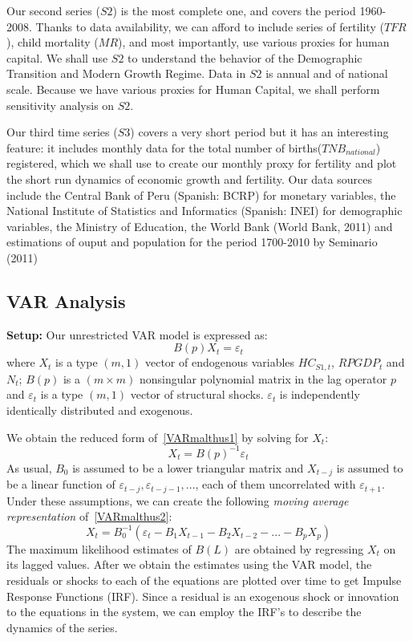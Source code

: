 \documentclass[12pt]{article}%
\begin{document}
Our second series ($S2$) is the most complete one, and covers the period 1960-2008. Thanks to data availability, we can afford to include series of fertility ($TFR$), child mortality ($MR$), and most importantly, use various proxies for human capital. We shall use $S2$ to understand the behavior of the Demographic Transition and Modern Growth Regime. Data in $S2$ is annual and of national scale. Because we have various proxies for Human Capital, we shall perform sensitivity analysis on $S2$.

Our third time series ($S3$) covers a very short period but it has an interesting feature: it includes monthly data for the total number of births($TNB_{national}$) registered, which we shall use to create our monthly proxy for fertility and plot the short run dynamics of economic growth and fertility. Our data sources include the Central Bank of Peru (Spanish: BCRP) for monetary variables, the National Institute of Statistics and Informatics (Spanish: INEI) for demographic variables, the Ministry of Education, the World Bank (World Bank, 2011) and estimations of ouput and population for the period 1700-2010 by Seminario (2011)
\subsection{VAR Analysis}
\textbf{Setup:} Our unrestricted VAR model is expressed as:
\begin{equation}\label{VARmalthus1}
B(p)X_{t}=\varepsilon_{t}
\end{equation}
where $X_{t}$ is a type $(m,1)$ vector of endogenous variables $HC_{S1,t}$, $RPGDP_{t}$ and $N_{t}$; $B(p)$ is a $(m\times m)$ nonsingular polynomial matrix in the lag operator $p$ and $\varepsilon_{t}$ is a type $(m,1)$ vector of structural shocks. $\varepsilon_{t}$ is independently identically distributed and exogenous. 

We obtain the reduced form of~\ref{VARmalthus1} by solving for $X_{t}$:
\begin{equation}\label{VARmalthus2}
X_{t}=B(p)^{-1}\varepsilon_{t}
\end{equation}
As usual, $B_{0}$ is assumed to be a lower triangular matrix and $X_{t-j}$ is assumed to be a linear function of $\varepsilon_{t-j}, \varepsilon_{t-j-1},...$, each of them uncorrelated with $\varepsilon_{t+1}$. Under these assumptions, we can create the following \emph{moving average representation} of~\ref{VARmalthus2}:
\begin{equation}\label{VARmalthus3}
X_{t}=B^{-1}_{0}(\varepsilon_{t}-B_{1}X_{t-1}-B_{2}X_{t-2}-...-B_{p}X_{p})
\end{equation}
The maximum likelihood estimates of $B(L)$ are obtained by regressing $X_{t}$ on its lagged values. After we obtain the estimates using the VAR model, the residuals or shocks to each of the equations are plotted over time to get Impulse Response Functions (IRF). Since a residual is an exogenous shock or innovation to the equations in the system, we can employ the IRF's to describe the dynamics of the series.
\end{document}
